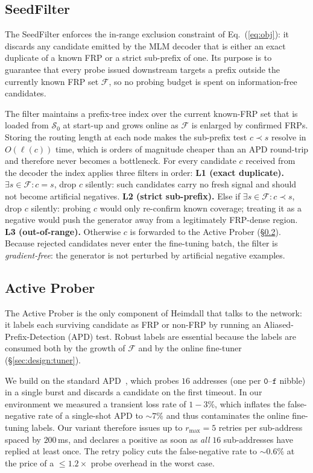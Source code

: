 \documentclass[conference]{IEEEtran}
\begin{document}
\subsection{SeedFilter}
\label{sec:design:seedfilter}
The SeedFilter enforces the
in-range exclusion constraint of Eq.~(\ref{eq:obj}): it
discards any candidate emitted by the MLM decoder that is
either an exact duplicate of a known FRP or a strict sub-prefix
of one.  Its purpose is to guarantee that every probe issued
downstream targets a prefix outside the currently known FRP
set $\mathcal{F}$, so no probing budget is spent on
information-free candidates.

The filter maintains a prefix-tree index
over the current known-FRP set that is loaded from
$\mathcal{S}_{0}$ at start-up and grows online as $\mathcal{F}$
is enlarged by confirmed FRPs.  Storing the routing length at
each node makes the sub-prefix test $c\!\prec\!s$ resolve in
$O(\ell(c))$ time, which is orders of magnitude cheaper than
an APD round-trip and therefore never becomes a bottleneck.
For every candidate $c$ received from the decoder the index
applies three filters in order:
\textbf{L1 (exact duplicate).}$\exists s\!\in\!\mathcal{F}:c{=}s$, drop $c$ silently: such
candidates carry no fresh signal and should not become
artificial negatives.
\textbf{L2 (strict sub-prefix).}  Else if
$\exists s\!\in\!\mathcal{F}:c\!\prec\!s$, drop $c$ silently:
probing $c$ would only re-confirm known coverage; treating it
as a negative would push the generator away from a legitimately
FRP-dense region.
\textbf{L3 (out-of-range).}  Otherwise $c$ is forwarded to the
Active Prober (\S\ref{sec:design:prober}).  Because rejected
candidates never enter the fine-tuning batch, the filter is
\emph{gradient-free}: the generator is not perturbed by
artificial negative examples.

\subsection{Active Prober}
\label{sec:design:prober}
The Active Prober is the only
component of Heimdall that talks to the network: it labels
each surviving candidate as FRP or non-FRP by running an
Aliased-Prefix-Detection (APD) test.  Robust labels are
essential because the labels are consumed both by the growth
of $\mathcal{F}$ and by the online fine-tuner
(\S\ref{sec:design:tuner}).

We build on the standard
APD~\cite{gasser2018clusters}, which probes $16$ addresses
(one per $\texttt{0}$--$\texttt{f}$ nibble) in a single burst
and discards a candidate on the first timeout.  In our
environment we measured a transient loss rate of
$1\!-\!3\%$, which inflates the false-negative rate of a
single-shot APD to $\sim\!7\%$ and thus contaminates the
online fine-tuning labels.  Our variant therefore issues up
to $r_{\max}\!=\!5$ retries per sub-address spaced by
$200$\,ms, and declares a positive as soon as \emph{all} $16$
sub-addresses have replied at least once.  The retry policy
cuts the false-negative rate to $\sim\!0.6\%$ at the price of
a $\leq\!1.2\times$ probe overhead in the worst case.
\end{document}
